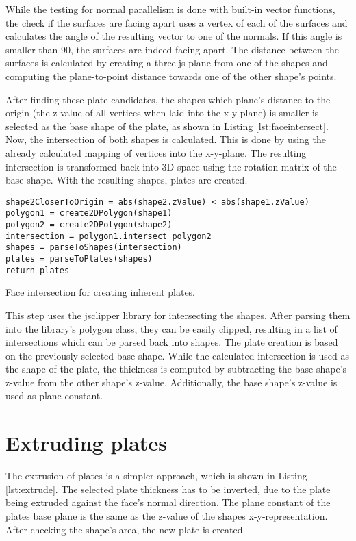 \documentclass[../ClassicThesis.tex]{subfiles}
\begin{document}
While the testing for normal parallelism is done with built-in vector functions, the check if the surfaces are facing apart uses a vertex of each of the surfaces and calculates the angle of the resulting vector to one of the normals. If this angle is smaller than 90\textdegree, the surfaces are indeed facing apart. The distance between the surfaces is calculated by creating a three.js plane from one of the shapes and computing the plane-to-point distance towards one of the other shape's points.

After finding these plate candidates, the shapes which plane's distance to the origin (the z-value of all vertices when laid into the x-y-plane) is smaller is selected as the base shape of the plate, as shown in Listing \ref{lst:faceintersect}. Now, the intersection of both shapes is calculated. This is done by using the already calculated mapping of vertices into the x-y-plane. The resulting intersection is transformed back into 3D-space using the rotation matrix of the base shape. With the resulting shapes, plates are created.

\begin{listing}[ht]
\begin{verbatim}
shape2CloserToOrigin = abs(shape2.zValue) < abs(shape1.zValue)
polygon1 = create2DPolygon(shape1)
polygon2 = create2DPolygon(shape2)
intersection = polygon1.intersect polygon2
shapes = parseToShapes(intersection)
plates = parseToPlates(shapes)
return plates
\end{verbatim}
\caption{Face intersection for creating inherent plates.}
\label{lst:faceintersect}
\end{listing}

This step uses the jsclipper library for intersecting the shapes. After parsing them into the library's polygon class, they can be easily clipped, resulting in a list of intersections which can be parsed back into shapes. The plate creation is based on the previously selected base shape. While the calculated intersection is used as the shape of the plate, the thickness is computed by subtracting the base shape's z-value from the other shape's z-value. Additionally, the base shape's z-value is used as plane constant.

\section{Extruding plates}

The extrusion of plates is a simpler approach, which is shown in Listing \ref{lst:extrude}. The selected plate thickness has to be inverted, due to the plate being extruded against the face's normal direction. The plane constant of the plates base plane is the same as the z-value of the shapes x-y-representation. After checking the shape's area, the new plate is created.
\end{document}
